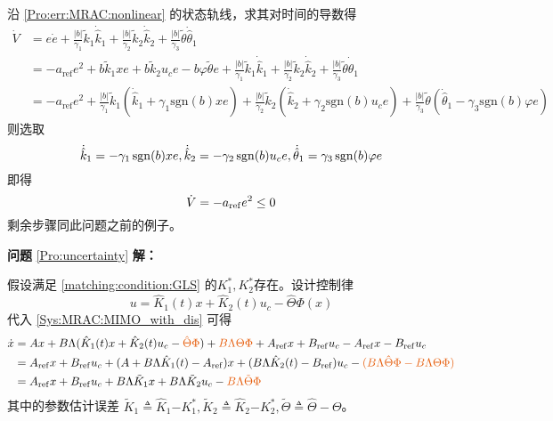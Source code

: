 沿 \eqref{Pro:err:MRAC:nonlinear} 的状态轨线，求其对时间的导数得
\begin{equation*}
    \begin{aligned}\dot{V}&= e\dot{e}+\frac{|b|}{\gamma_{1}}\tilde{k}_{1}\dot{\hat{k}}_{1}+\frac{|b|}{\gamma_{2}}\tilde{k}_{2}\dot{\hat{k}}_{2}+\frac{|b|}{\gamma_{3}}\tilde{\theta}\dot{\hat{\theta}}_{1}\\
    &=-a_{\mathrm{ref}}e^{2}+b\tilde{k}_{1}xe+b\tilde{k}_{2}u_{c}e-b\varphi\tilde{\theta}e+\frac{|b|}{\gamma_{1}}\tilde{k}_{1}\dot{\hat{k}}_{1}+\frac{|b|}{\gamma_{2}}\tilde{k}_{2}\dot{\hat{k}}_{2}+\frac{|b|}{\gamma_{3}}\tilde{\theta}\dot{\hat{\theta}}_{1}\\
    &=-a_{\mathrm{ref}}e^{2}+\frac{|b|}{\gamma_{1}}\tilde{k}_{1}\left(\dot{\hat{k}}_{1}+\gamma_{1}\mathrm{sgn}(b)xe\right)+\frac{|b|}{\gamma_{2}}\tilde{k}_{2}\left(\dot{\hat{k}}_{2}+\gamma_{2}\mathrm{sgn}(b)u_{c}e\right)+\frac{|b|}{\gamma_{3}}\tilde{\theta}\left(\dot{\hat{\theta}}_{1}-\gamma_{3}\mathrm{sgn}(b)\varphi e\right)\end{aligned}
\end{equation*}
则选取
\begin{equation*}
  \dot{\hat{k}}_1 = -  \gamma_1 \operatorname{sgn} (b) x  e,
  \dot{\hat{k}}_2 = -  \gamma_2 \operatorname{sgn} (b)  u_c e,
  \dot{\hat{\theta}}_1 = \gamma_3 \operatorname{sgn} (b)   \varphi e
\end{equation*}
即得
\begin{equation*}
  \dot{V} = - a_{\operatorname{ref}} e^2 \leq 0
\end{equation*}
剩余步骤同此问题之前的例子。

\noindent\textbf{问题} \ref{Pro:uncertainty} \textbf{解：}

假设满足 \eqref{matching:condition:GLS} 的$K^{\ast}_1, K^{\ast}_2$存在。设计控制律\[ u = \hat{K}_1 (t) x + \hat{K}_2 (t) u_c - \hat{\Theta}\Phi (x)  \]
代入 \eqref{Sys:MRAC:MIMO_with_dis} 可得
\begin{align}
    \dot{x}&=A  x + B \Lambda (\hat{K}_1 (t) x + \hat{K}_2 (t) u_c-\textcolor{second}{\hat{\Theta}\Phi})+\textcolor{second}{B\Lambda\Theta\Phi}+
    A_{\refval} x +
    B_{\refval} u_c-A_{\refval} x -
    B_{\refval} u_c\nonumber\\
    &=A_{\refval} x +
    B_{\refval} u_c+(A + B \Lambda \hat{K}_1 (t)-A_{\refval}) x+(B\Lambda\hat{K}_2 (t)-B_{\refval}) u_c-\textcolor{second}{(B\Lambda\hat{\Theta}\Phi-B\Lambda\Theta\Phi)}\nonumber\\
    &=A_{\refval}  x +
   B_{\refval} u_c + B \Lambda  \tilde{K}_1 x + B
   \Lambda  \tilde{K}_2 u_c -\textcolor{second}{B\Lambda\tilde{\Theta}\Phi}\label{mimo_with_dis_dotx}
\end{align}
其中的参数估计误差 $\tilde{K}_1 \triangleq \hat{K}_1 {- K_1^{\ast}} , \tilde{K}_2 \triangleq \hat{K}_2 {- K_2^{\ast}} ,\tilde{\Theta}\triangleq\hat{\Theta}-\Theta$。

